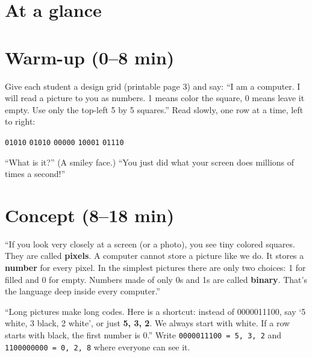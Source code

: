 \section{At a glance}
\begin{timeplan}
\end{timeplan}

\section{Warm-up (0--8 min)}
\begin{unplugged}
Give each student a design grid (printable page 3) and say: \enquote{I am a computer. I will read a picture to you as numbers. 1 means color the square, 0 means leave it empty. Use only the top-left 5 by 5 squares.} Read slowly, one row at a time, left to right:
\begin{center}
\texttt{01010} \quad \texttt{01010} \quad \texttt{00000} \quad \texttt{10001} \quad \texttt{01110}
\end{center}
\enquote{What is it?} (A smiley face.) \enquote{You just did what your screen does millions of times a second!}
\end{unplugged}

\section{Concept (8--18 min)}
\begin{teacherscript}
\enquote{If you look very closely at a screen (or a photo), you see tiny colored squares. They are called \textbf{pixels}. A computer cannot store a picture like we do. It stores a \textbf{number} for every pixel. In the simplest pictures there are only two choices: 1 for filled and 0 for empty. Numbers made of only 0s and 1s are called \textbf{binary}. That's the language deep inside every computer.}

\enquote{Long pictures make long codes. Here is a shortcut: instead of 0000011100, say \enquote{5 white, 3 black, 2 white}, or just \textbf{5, 3, 2}. We always start with white. If a row starts with black, the first number is 0.} Write \texttt{0000011100 = 5, 3, 2} and \texttt{1100000000 = 0, 2, 8} where everyone can see it.
\end{teacherscript}

